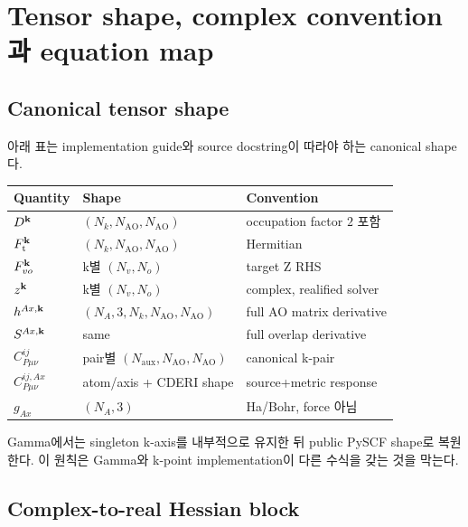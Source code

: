 \appendix
\section{Tensor shape, complex convention과 equation map}
\label{sec:appendices}

\subsection{Canonical tensor shape}

아래 표는 implementation guide와 source docstring이 따라야 하는 canonical shape다.

\begin{center}
\begin{longtable}{p{}p{}p{}}
\toprule
Quantity & Shape & Convention \\
\midrule
$D^{\mathbf{k}}$ & $(N_k,N_{\mathrm{AO}},N_{\mathrm{AO}})$ & occupation factor $2$ 포함 \\
$F_{\mathrm t}^{\mathbf{k}}$ & $(N_k,N_{\mathrm{AO}},N_{\mathrm{AO}})$ & Hermitian \\
$F_{vo}^{\mathbf{k}}$ & k별 $(N_v,N_o)$ & target Z RHS \\
$z^{\mathbf{k}}$ & k별 $(N_v,N_o)$ & complex, realified solver \\
$h^{Ax,\mathbf{k}}$ & $(N_A,3,N_k,N_{\mathrm{AO}},N_{\mathrm{AO}})$ & full AO matrix derivative \\
$S^{Ax,\mathbf{k}}$ & same & full overlap derivative \\
$C^{ij}_{P\mu\nu}$ & pair별 $(N_{\mathrm{aux}},N_{\mathrm{AO}},N_{\mathrm{AO}})$ & canonical k-pair \\
$C^{ij,Ax}_{P\mu\nu}$ & atom/axis + CDERI shape & source+metric response \\
$g_{Ax}$ & $(N_A,3)$ & Ha/Bohr, force 아님 \\
\bottomrule
\end{longtable}
\end{center}

Gamma에서는 singleton k-axis를 내부적으로 유지한 뒤 public PySCF shape로 복원한다. 이
원칙은 Gamma와 k-point implementation이 다른 수식을 갖는 것을 막는다.

\subsection{Complex-to-real Hessian block}

